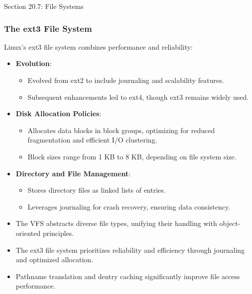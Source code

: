 \begin{notes}{Section 20.7: File Systems}
    \subsubsection*{The ext3 File System}
    
    Linux's ext3 file system combines performance and reliability:
    \begin{itemize}
        \item \textbf{Evolution}:
        \begin{itemize}
            \item Evolved from ext2 to include journaling and scalability features.
            \item Subsequent enhancements led to ext4, though ext3 remains widely used.
        \end{itemize}
        \item \textbf{Disk Allocation Policies}:
        \begin{itemize}
            \item Allocates data blocks in block groups, optimizing for reduced fragmentation and efficient I/O clustering.
            \item Block sizes range from 1 KB to 8 KB, depending on file system size.
        \end{itemize}
        \item \textbf{Directory and File Management}:
        \begin{itemize}
            \item Stores directory files as linked lists of entries.
            \item Leverages journaling for crash recovery, ensuring data consistency.
        \end{itemize}
    \end{itemize}
    
    \begin{highlight}
        \begin{itemize}
            \item The VFS abstracts diverse file types, unifying their handling with object-oriented principles.
            \item The ext3 file system prioritizes reliability and efficiency through journaling and optimized allocation.
            \item Pathname translation and dentry caching significantly improve file access performance.
        \end{itemize}
    \end{highlight}
\end{notes}

